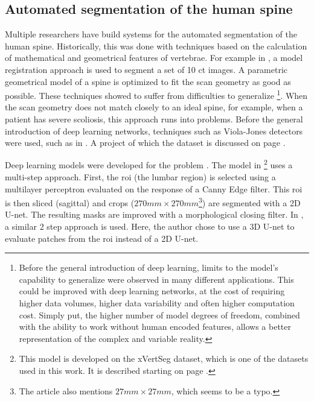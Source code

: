 \subsection{Automated segmentation of the human spine}
\par{
    Multiple researchers have build systems for the automated segmentation of the human spine.
    Historically, this was done with techniques based on the calculation of mathematical and geometrical features of vertebrae. 
    For example in \cite{Klinder2008}, a model registration approach is used to segment a set of 10 \acrshort{ct} images.
    A parametric geometrical model of a spine is optimized to fit the scan geometry as good as possible.
    These techniques showed to suffer from difficulties to generalize
    \footnote{Before the general introduction of deep learning, limits to the model's capability to generalize were observed in many different applications.
    This could be improved with deep learning networks, at the cost of requiring higher data volumes, higher data variability and often higher computation cost.
    Simply put, the higher number of model degrees of freedom, combined with the ability to work without human encoded features, allows a better representation of the complex and variable reality.}. 
    When the scan geometry does not match closely to an ideal spine, for example, when a patient has severe scoliosis, this approach runs into problems.
    Before the general introduction of deep learning networks, techniques such as Viola-Jones detectors were used, such as in \cite{Zukic2014}. 
    A project of which the dataset is discussed on page \pageref{sec:DataUSiegen}.
}
\par{
    Deep learning models were developed for the problem \cite{Sekuboyina2017, Janssens2018, Chuang2019, Lessmann2018}.
    The model in \cite{Sekuboyina2017}\footnote{This model is developed on the xVertSeg dataset, which is one of the datasets used in this work. It is described starting on page \pageref{sec:xVertSeg}.} 
    uses a multi-step approach. First, the \acrfull{roi} (the lumbar region) is selected using a multilayer perceptron evaluated on the response of a Canny Edge filter.
    This \acrshort{roi} is then sliced (sagittal) and crops ($270mm \times 270mm$\footnote{The article also mentions $27mm \times 27mm$, which seems to be a typo.}) are segmented with a 2D U-net. 
    The resulting masks are improved with a morphological closing filter. 
    In \cite{Janssens2018}, a similar 2 step approach is used. Here, the author chose to use a 3D U-net to evaluate patches from the \acrshort{roi} instead of a 2D U-net.
}
